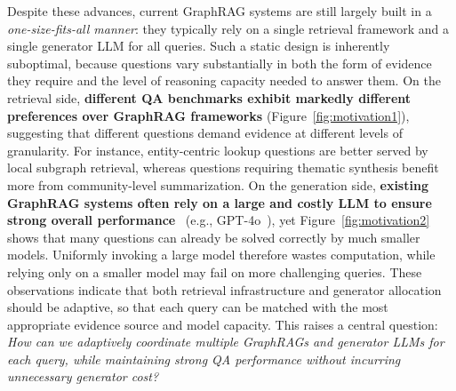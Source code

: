 Despite these advances, current GraphRAG systems are still largely built in a \textit{one-size-fits-all manner}: they typically rely on a single retrieval framework and a single generator LLM for all queries. Such a static design is inherently suboptimal, because questions vary substantially in both the form of evidence they require and the level of reasoning capacity needed to answer them. On the retrieval side, \textbf{different QA benchmarks exhibit markedly different preferences over GraphRAG frameworks} (Figure~\ref{fig:motivation1}), suggesting that different questions demand evidence at different levels of granularity. For instance, entity-centric lookup questions are better served by local subgraph retrieval, whereas questions requiring thematic synthesis benefit more from community-level summarization. On the generation side, \textbf{existing GraphRAG systems often rely on a large and costly LLM to ensure strong overall performance}~\cite{GraphRAG, HippoRAG2} (e.g., GPT-4o~\cite{GPT4}), yet Figure~\ref{fig:motivation2} shows that many questions can already be solved correctly by much smaller models. Uniformly invoking a large model therefore wastes computation, while relying only on a smaller model may fail on more challenging queries. These observations indicate that both retrieval infrastructure and generator allocation should be adaptive, so that each query can be matched with the most appropriate evidence source and model capacity. This raises a central question:
\textit{How can we adaptively coordinate multiple GraphRAGs and generator LLMs for each query, while maintaining strong QA performance without incurring unnecessary generator cost?}

